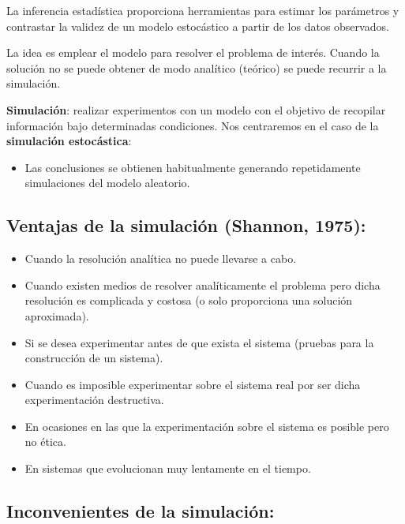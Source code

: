 \documentclass[]{book}
\providecommand{\tightlist}{%
  \setlength{\itemsep}{0pt}\setlength{\parskip}{0pt}}
\theoremstyle{definition}
\theoremstyle{definition}
\theoremstyle{definition}
\theoremstyle{remark}
\begin{document}
La inferencia estadística proporciona herramientas para estimar los
parámetros y contrastar la validez de un modelo estocástico a partir de
los datos observados.

La idea es emplear el modelo para resolver el problema de interés.
Cuando la solución no se puede obtener de modo analítico (teórico) se
puede recurrir a la simulación.

\textbf{Simulación}: realizar experimentos con un modelo con el objetivo
de recopilar información bajo determinadas condiciones. Nos centraremos
en el caso de la \textbf{simulación estocástica}:

\begin{itemize}
\tightlist
\item
  Las conclusiones se obtienen habitualmente generando repetidamente
  simulaciones del modelo aleatorio.
\end{itemize}

\subsection{Ventajas de la simulación (Shannon,
1975):}\label{ventajas-de-la-simulacion-shannon-1975}

\begin{itemize}
\item
  Cuando la resolución analítica no puede llevarse a cabo.
\item
  Cuando existen medios de resolver analíticamente el problema pero
  dicha resolución es complicada y costosa (o solo proporciona una
  solución aproximada).
\item
  Si se desea experimentar antes de que exista el sistema (pruebas para
  la construcción de un sistema).
\item
  Cuando es imposible experimentar sobre el sistema real por ser dicha
  experimentación destructiva.
\item
  En ocasiones en las que la experimentación sobre el sistema es posible
  pero no ética.
\item
  En sistemas que evolucionan muy lentamente en el tiempo.
\end{itemize}

\subsection{Inconvenientes de la
simulación:}\label{inconvenientes-de-la-simulacion}
\end{document}
